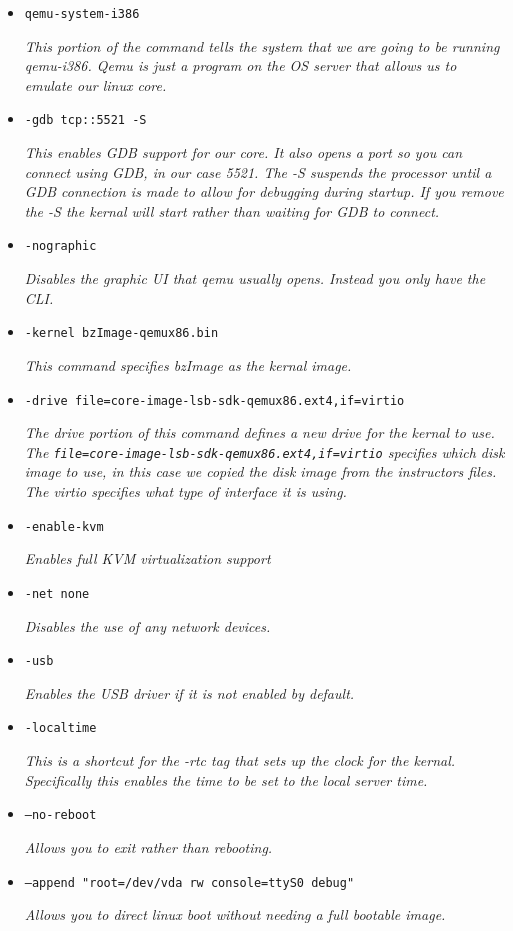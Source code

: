 \documentclass[letterpaper,10pt,titlepage]{article}
\begin{document}
\begin{itemize}
\item{\texttt{qemu-system-i386}}

\textsl{This portion of the command tells the system that we are going to be 
running qemu-i386. Qemu is just a program on the OS server that allows us to 
emulate our linux core. }
\item{\texttt{-gdb tcp::5521 -S}}

\textsl{This enables GDB support for our core. It also opens a port so you can 
connect using GDB, in our case 5521. The -S suspends the processor until a GDB 
connection is made to allow for debugging during startup. If you remove the -S 
the kernal will start rather than waiting for GDB to connect.}
\item{\texttt{-nographic}}

\textsl{Disables the graphic UI that qemu usually opens. Instead you only have 
the CLI.}
\item{\texttt{-kernel bzImage-qemux86.bin}}

\textsl{This command specifies  bzImage as the kernal image.}
\item{\texttt{-drive file=core-image-lsb-sdk-qemux86.ext4,if=virtio}}

\textsl{The drive portion of this command defines a new drive for the kernal to 
use. The \texttt{file=core-image-lsb-sdk-qemux86.ext4,if=virtio} specifies which 
disk image to use, in this case we copied the disk image from the instructors 
files. The virtio specifies what type of interface it is using.}
\item{\texttt{-enable-kvm}}

\textsl{Enables full KVM virtualization support}
\item{\texttt{-net none}}

\textsl{Disables the use of any network devices. }
\item{\texttt{-usb}}

\textsl{Enables the USB driver if it is not enabled by default.}
\item{\texttt{-localtime}}

\textsl{This is a shortcut for the -rtc tag that sets up the clock for the 
kernal. Specifically this enables the time to be set to the local server time.}
\item{\texttt{--no-reboot}}

\textsl{Allows you to exit rather than rebooting.}
\item{\texttt{--append "root=/dev/vda rw console=ttyS0 debug"}}

\textsl{Allows you to direct linux boot without needing a full bootable 
image.}

\end{itemize}
\end{document}

